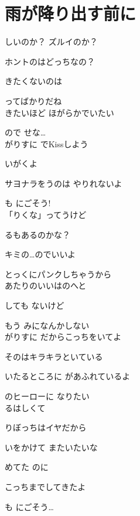 \section{ 雨が降り出す前に}
\large{

しいのか？ ズルイのか？

ホントのはどっちなの？

きたくないのは 

 ってばかりだね
\\

きたいほど ほがらかでいたい

ので せな…
\\

がりすに でKissしよう

いがくよ

サヨナラをうのは やりれないよ

も にごそう!
\\

「りくな」ってうけど

るもあるのかな？

キミの…のでいいよ

とっくにパンクしちゃうから
\\

あたりのいいはのへと

しても ないけど

もう みになんかしない
\\

がりすに だからこっちをいてよ

そのはキラキラといている

いたるところに があふれているよ

のヒーローに なりたい
\\

るはしくて

りぼっちはイヤだから

いをかけて またいたいな

めてた のに

こっちまでしてきたよ

も にごそう…

}